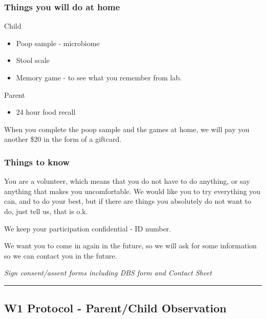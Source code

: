 \documentclass[
]{book}
\providecommand{\tightlist}{%
  \setlength{\itemsep}{0pt}\setlength{\parskip}{0pt}}
\begin{document}
\hypertarget{things-you-will-do-at-home}{%
\subsubsection{Things you will do at home}\label{things-you-will-do-at-home}}

Child

\begin{itemize}
\tightlist
\item
  Poop sample - microbiome
\item
  Stool scale
\item
  Memory game - to see what you remember from lab.
\end{itemize}

Parent

\begin{itemize}
\tightlist
\item
  24 hour food recall
\end{itemize}

When you complete the poop sample and the games at home, we will pay you another \$20 in the form of a giftcard.

\hypertarget{things-to-know}{%
\subsubsection{Things to know}\label{things-to-know}}

You are a volunteer, which means that you do not have to do anything, or say anything that makes you uncomfortable. We would like you to try everything you can, and to do your best, but if there are things you absolutely do not want to do, just tell us, that is o.k.

We keep your participation confidential - ID number.

We want you to come in again in the future, so we will ask for some information so we can contact you in the future.

\emph{Sign consent/assent forms including DBS form and Contact Sheet}

\begin{center}\rule{0.5\linewidth}{0.5pt}\end{center}

\hypertarget{w1-protocol---parentchild-observation}{%
\subsection{W1 Protocol - Parent/Child Observation}\label{w1-protocol---parentchild-observation}}
\end{document}
